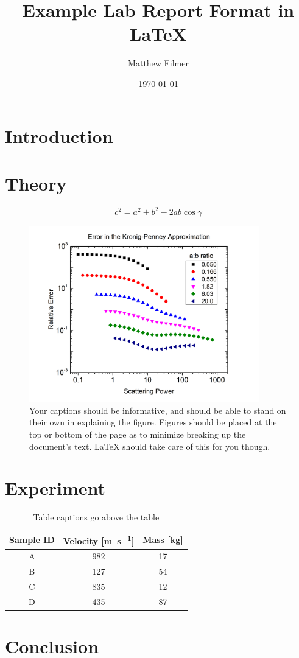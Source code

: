 \documentclass{microereport}
\author{Matthew Filmer}
\date{\today}
\title{Example Lab Report Format in \LaTeX{}}
\begin{document}
\maketitle
\begin{abstract}
	\lipsum[1]
\end{abstract}

\section{Introduction}
\lipsum[2-4]

\section{Theory}
\lipsum[5]
\begin{equation}
	c^2 = a^2 + b^2 - 2ab\cos\gamma
	\label{equ:lawOfCosines}
\end{equation}
\lipsum[6]
\begin{figure}
	\centering
	\includegraphics[width=10cm]{error}
	\caption{Your captions should be informative, and should be able to stand on their own in explaining the figure. Figures should be placed at the top or bottom of the page as to minimize breaking up the document's text. \LaTeX{} should take care of this for you though.}
	\label{fig:KPerror}
\end{figure}
\lipsum[7]

\section{Experiment}
\lipsum[8-10]
\begin{table}
	\centering
	\caption{Table captions go above the table}
	\label{tab:table}
	\begin{tabular}{ccc}
		\toprule
		Sample ID	& Velocity [\si{\meter\per\second}]	& Mass [\si{\kilo\gram}]\\
		\midrule
		A			& 982	& 17\\
		B			& 127	& 54\\
		C			& 835	& 12\\
		D			& 435	& 87\\
		\bottomrule
	\end{tabular}
\end{table}
\lipsum[11-12]

\section{Conclusion}
\lipsum[13-14]

\nocite{sample1,sample2}


\end{document}

